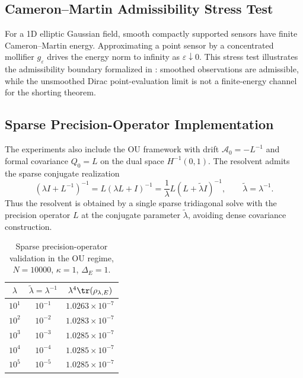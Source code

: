 \subsection{Cameron--Martin Admissibility Stress Test}
\label{supp:cameron_martin_failure}

For a 1D elliptic Gaussian field, smooth compactly supported sensors have finite
Cameron--Martin energy.  Approximating a point sensor by a concentrated
mollifier $g_\varepsilon$ drives the energy norm to infinity as
$\varepsilon\downarrow0$.  This stress test illustrates the admissibility
boundary formalized in : smoothed observations
are admissible, while the unsmoothed Dirac point-evaluation limit is not a
finite-energy channel for the shorting theorem.

\subsection{Sparse Precision-Operator Implementation}
\label{supp:sparse_precision}

The experiments also include the OU framework with drift
$\mathcal{A}_0=-L^{-1}$ and formal covariance $Q_0=L$ on the dual space
$H^{-1}(0,1)$.  The resolvent admits the sparse conjugate realization
\[
  (\lambda I+L^{-1})^{-1}
  =L(\lambda L+I)^{-1}
  =
  \frac{1}{\lambda}L(L+\tilde{\lambda}I)^{-1},
  \qquad
  \tilde{\lambda}=\lambda^{-1}.
\]
Thus the resolvent is obtained by a single sparse tridiagonal solve with the
precision operator $L$ at the conjugate parameter $\tilde{\lambda}$, avoiding
dense covariance construction.

\begin{table}[htbp]
  \centering
  \caption{Sparse precision-operator validation in the OU regime, $N=10000$,
  $\kappa=1$, $\Delta_E=1$.}
  \label{tab:supp_sparse_precision}
  \begin{tabular}{ccc}
    \toprule
    $\lambda$ & $\tilde{\lambda}=\lambda^{-1}$ &
    $\lambda^4\tr(\rho_{\lambda,E})$ \\
    \midrule
    $10^1$ & $10^{-1}$ & $1.0263\times10^{-7}$ \\
    $10^2$ & $10^{-2}$ & $1.0283\times10^{-7}$ \\
    $10^3$ & $10^{-3}$ & $1.0285\times10^{-7}$ \\
    $10^4$ & $10^{-4}$ & $1.0285\times10^{-7}$ \\
    $10^5$ & $10^{-5}$ & $1.0285\times10^{-7}$ \\
    \bottomrule
  \end{tabular}
\end{table}

